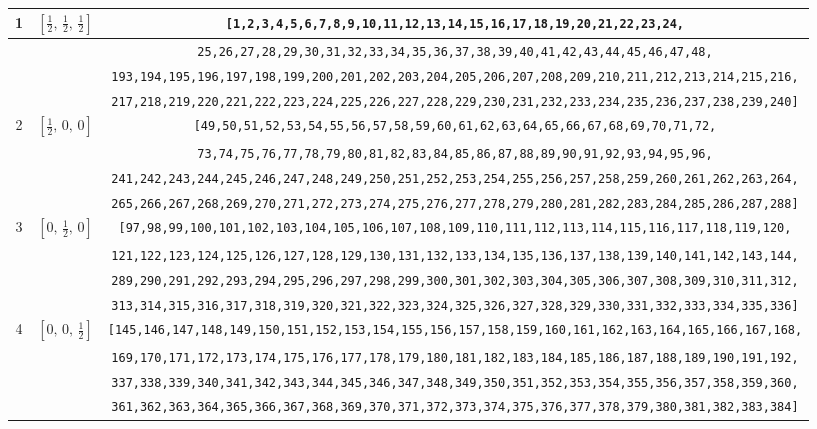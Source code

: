 \documentclass[fleqn,8pt]{jsarticle}
\begin{document}
\begin{longtable}{ccc}
1 & $\left[ \frac{1}{2},\, \frac{1}{2},\, \frac{1}{2} \right]$ & {\tt [1,2,3,4,5,6,7,8,9,10,11,12,13,14,15,16,17,18,19,20,21,22,23,24,} \\ \hline
 &  & {\tt 25,26,27,28,29,30,31,32,33,34,35,36,37,38,39,40,41,42,43,44,45,46,47,48,} \\ \hline
 &  & {\tt 193,194,195,196,197,198,199,200,201,202,203,204,205,206,207,208,209,210,211,212,213,214,215,216,} \\ \hline
 &  & {\tt 217,218,219,220,221,222,223,224,225,226,227,228,229,230,231,232,233,234,235,236,237,238,239,240]} \\ \hline
2 & $\left[ \frac{1}{2},\, 0,\, 0 \right]$ & {\tt [49,50,51,52,53,54,55,56,57,58,59,60,61,62,63,64,65,66,67,68,69,70,71,72,} \\ \hline
 &  & {\tt 73,74,75,76,77,78,79,80,81,82,83,84,85,86,87,88,89,90,91,92,93,94,95,96,} \\ \hline
 &  & {\tt 241,242,243,244,245,246,247,248,249,250,251,252,253,254,255,256,257,258,259,260,261,262,263,264,} \\ \hline
 &  & {\tt 265,266,267,268,269,270,271,272,273,274,275,276,277,278,279,280,281,282,283,284,285,286,287,288]} \\ \hline
3 & $\left[ 0,\, \frac{1}{2},\, 0 \right]$ & {\tt [97,98,99,100,101,102,103,104,105,106,107,108,109,110,111,112,113,114,115,116,117,118,119,120,} \\ \hline
 &  & {\tt 121,122,123,124,125,126,127,128,129,130,131,132,133,134,135,136,137,138,139,140,141,142,143,144,} \\ \hline
 &  & {\tt 289,290,291,292,293,294,295,296,297,298,299,300,301,302,303,304,305,306,307,308,309,310,311,312,} \\ \hline
 &  & {\tt 313,314,315,316,317,318,319,320,321,322,323,324,325,326,327,328,329,330,331,332,333,334,335,336]} \\ \hline
4 & $\left[ 0,\, 0,\, \frac{1}{2} \right]$ & {\tt [145,146,147,148,149,150,151,152,153,154,155,156,157,158,159,160,161,162,163,164,165,166,167,168,} \\ \hline
 &  & {\tt 169,170,171,172,173,174,175,176,177,178,179,180,181,182,183,184,185,186,187,188,189,190,191,192,} \\ \hline
 &  & {\tt 337,338,339,340,341,342,343,344,345,346,347,348,349,350,351,352,353,354,355,356,357,358,359,360,} \\ \hline
 &  & {\tt 361,362,363,364,365,366,367,368,369,370,371,372,373,374,375,376,377,378,379,380,381,382,383,384]} \\
\end{longtable}
\end{document}
